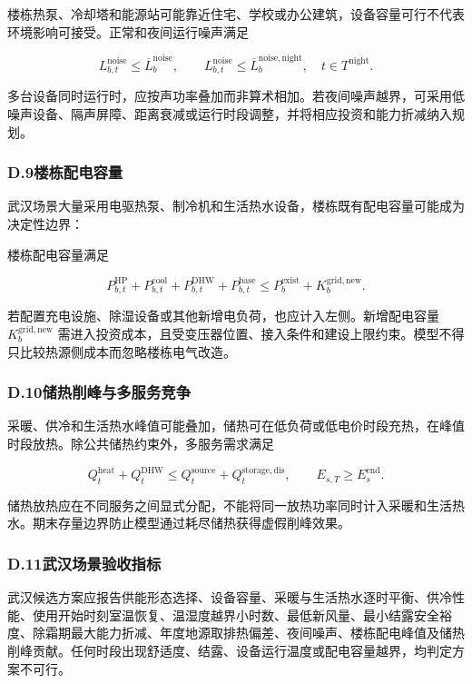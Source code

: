 楼栋热泵、冷却塔和能源站可能靠近住宅、学校或办公建筑，设备容量可行不代表环境影响可接受。正常和夜间运行噪声满足

\begin{equation}
L_{b,t}^{\mathrm{noise}}\leq\overline L_b^{\mathrm{noise}},
\qquad
L_{b,t}^{\mathrm{noise}}\leq\overline L_b^{\mathrm{noise,night}},
\quad t\in T^{\mathrm{night}}.
\label{eq:wuhan_noise}
\end{equation}

多台设备同时运行时，应按声功率叠加而非算术相加。若夜间噪声越界，可采用低噪声设备、隔声屏障、距离衰减或运行时段调整，并将相应投资和能力折减纳入规划。

\subsubsection*{D.9\quad 楼栋配电容量}

武汉场景大量采用电驱热泵、制冷机和生活热水设备，楼栋既有配电容量可能成为决定性边界：

楼栋配电容量满足

\begin{equation}
P_{b,t}^{\mathrm{HP}}+P_{b,t}^{\mathrm{cool}}+P_{b,t}^{\mathrm{DHW}}+P_{b,t}^{\mathrm{base}}
\leq P_b^{\mathrm{exist}}+K_b^{\mathrm{grid,new}}.
\label{eq:wuhan_grid}
\end{equation}

若配置充电设施、除湿设备或其他新增电负荷，也应计入左侧。新增配电容量 $K_b^{\mathrm{grid,new}}$ 需进入投资成本，且受变压器位置、接入条件和建设上限约束。模型不得只比较热源侧成本而忽略楼栋电气改造。

\subsubsection*{D.10\quad 储热削峰与多服务竞争}

采暖、供冷和生活热水峰值可能叠加，储热可在低负荷或低电价时段充热，在峰值时段放热。除公共储热约束外，多服务需求满足

\begin{equation}
Q_t^{\mathrm{heat}}+Q_t^{\mathrm{DHW}}
\leq Q_t^{\mathrm{source}}+Q_t^{\mathrm{storage,dis}},
\qquad
E_{s,T}\geq E_s^{\mathrm{end}}.
\label{eq:wuhan_storage_peak}
\end{equation}

储热放热应在不同服务之间显式分配，不能将同一放热功率同时计入采暖和生活热水。期末存量边界防止模型通过耗尽储热获得虚假削峰效果。

\subsubsection*{D.11\quad 武汉场景验收指标}

武汉候选方案应报告供能形态选择、设备容量、采暖与生活热水逐时平衡、供冷性能、使用开始时刻室温恢复、温湿度越界小时数、最低新风量、最小结露安全裕度、除霜期最大能力折减、年度地源取排热偏差、夜间噪声、楼栋配电峰值及储热削峰贡献。任何时段出现舒适度、结露、设备运行温度或配电容量越界，均判定方案不可行。
